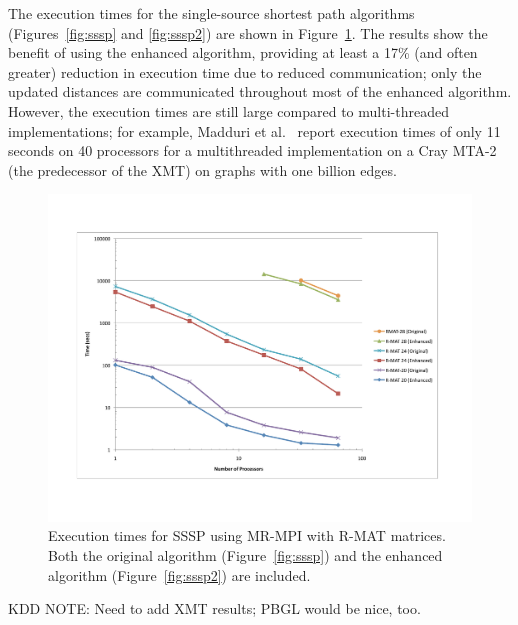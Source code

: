 The execution times for the single-source shortest path algorithms
(Figures~\ref{fig:sssp} and \ref{fig:sssp2})
are shown in Figure~\ref{f:sssp}.  The results show the benefit of
using the enhanced algorithm, providing at least a 17\% (and often greater)
reduction in execution time due to reduced communication; only the updated
distances are communicated throughout most of the enhanced algorithm.
However, the execution times are still large compared to multi-threaded
implementations; for example, Madduri et al.~\cite{Madduri07} report
execution times of only 11 seconds on 40 
processors for a multithreaded implementation on a Cray MTA-2
(the predecessor of the XMT) on graphs with one billion edges.

\begin{figure}[htb]
\includegraphics[width=\textwidth]{fig_sssp.pdf}
\caption{Execution times for SSSP using MR-MPI with R-MAT matrices.  
Both the original algorithm (Figure~\ref{fig:sssp}) and the enhanced 
algorithm (Figure~\ref{fig:sssp2}) are included.}
\label{f:sssp}
\end{figure}

KDD NOTE:  Need to add XMT results; PBGL would be nice, too.


